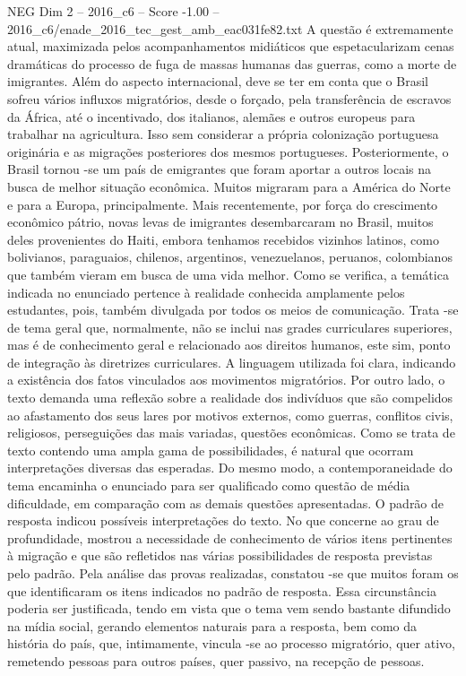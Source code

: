 \begin{textsample}{NEG Dim 2 – 2016\_c6 – Score -1.00 – 2016\_c6/enade\_2016\_tec\_gest\_amb\_eac031fe82.txt}
A questão é extremamente atual, maximizada pelos acompanhamentos midiáticos que espetacularizam cenas dramáticas do processo de fuga de massas humanas das guerras, como a morte de imigrantes.
Além do aspecto internacional, deve se ter em conta que o Brasil sofreu vários influxos migratórios, desde o forçado, pela transferência de escravos da África, até o incentivado, dos italianos, alemães e outros europeus para trabalhar na agricultura.
Isso sem considerar a própria colonização portuguesa originária e as migrações posteriores dos mesmos portugueses.
Posteriormente, o Brasil tornou -se um país de emigrantes que foram aportar a outros locais na busca de melhor situação econômica.
Muitos migraram para a América do Norte e para a Europa, principalmente.
Mais recentemente, por força do crescimento econômico pátrio, novas levas de imigrantes desembarcaram no Brasil, muitos deles provenientes do Haiti, embora tenhamos recebidos vizinhos latinos, como bolivianos, paraguaios, chilenos, argentinos, venezuelanos, peruanos, colombianos que também vieram em busca de uma vida melhor.
Como se verifica, a temática indicada no enunciado pertence à realidade conhecida amplamente pelos estudantes, pois, também divulgada por todos os meios de comunicação.
Trata -se de tema geral que, normalmente, não se inclui nas grades curriculares superiores, mas é de conhecimento geral e relacionado aos direitos humanos, este sim, ponto de integração às diretrizes curriculares.
A linguagem utilizada foi clara, indicando a existência dos fatos vinculados aos movimentos migratórios.
Por outro lado, o texto demanda uma reflexão sobre a realidade dos indivíduos que são compelidos ao afastamento dos seus lares por motivos externos, como guerras, conflitos civis, religiosos, perseguições das mais variadas, questões econômicas.
Como se trata de texto contendo uma ampla gama de possibilidades, é natural que ocorram interpretações diversas das esperadas.
Do mesmo modo, a contemporaneidade do tema encaminha o enunciado para ser qualificado como questão de média dificuldade, em comparação com as demais questões apresentadas.
O padrão de resposta indicou possíveis interpretações do texto.
No que concerne ao grau de profundidade, mostrou a necessidade de conhecimento de vários itens pertinentes à migração e que são refletidos nas várias possibilidades de resposta previstas pelo padrão.
Pela análise das provas realizadas, constatou -se que muitos foram os que identificaram os itens indicados no padrão de resposta.
Essa circunstância poderia ser justificada, tendo em vista que o tema vem sendo bastante difundido na mídia social, gerando elementos naturais para a resposta, bem como da história do país, que, intimamente, vincula -se ao processo migratório, quer ativo, remetendo pessoas para outros países, quer passivo, na recepção de pessoas.

\end{textsample}
